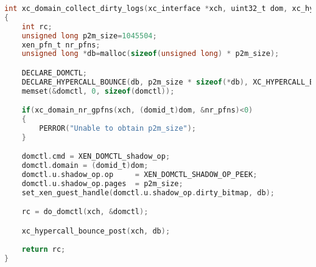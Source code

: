 \begin{lstlisting}[language=C, caption=Fonction xc\_domain\_collect\_dirty\_logs, label={lst:xc_domain_collect_dirty_logs}]
int xc_domain_collect_dirty_logs(xc_interface *xch, uint32_t dom, xc_hypercall_buffer_t *dirty_bitmap)
{
    int rc;
    unsigned long p2m_size=1045504;
    xen_pfn_t nr_pfns;
    unsigned long *db=malloc(sizeof(unsigned long) * p2m_size);

    DECLARE_DOMCTL;
    DECLARE_HYPERCALL_BOUNCE(db, p2m_size * sizeof(*db), XC_HYPERCALL_BUFFER_BOUNCE_OUT);
    memset(&domctl, 0, sizeof(domctl));

    if(xc_domain_nr_gpfns(xch, (domid_t)dom, &nr_pfns)<0)
    {
        PERROR("Unable to obtain p2m_size");
    }

    domctl.cmd = XEN_DOMCTL_shadow_op;
    domctl.domain = (domid_t)dom;
    domctl.u.shadow_op.op     = XEN_DOMCTL_SHADOW_OP_PEEK;
    domctl.u.shadow_op.pages  = p2m_size;
    set_xen_guest_handle(domctl.u.shadow_op.dirty_bitmap, db);

    rc = do_domctl(xch, &domctl);

    xc_hypercall_bounce_post(xch, db);
    
    return rc;
}
\end{lstlisting}

